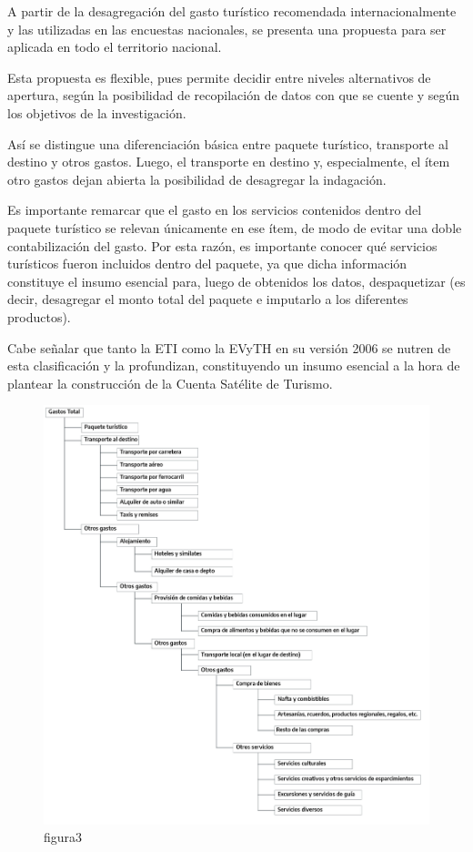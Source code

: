 \documentclass[
]{book}
\begin{document}
A partir de la desagregación del gasto turístico recomendada internacionalmente y las utilizadas en las encuestas nacionales, se presenta una propuesta para ser aplicada en todo el territorio nacional.

Esta propuesta es flexible, pues permite decidir entre niveles alternativos de apertura, según la posibilidad de recopilación de datos con que se cuente y según los objetivos de la investigación.

Así se distingue una diferenciación básica entre paquete turístico, transporte al destino y otros gastos. Luego, el transporte en destino y, especialmente, el ítem otro gastos dejan abierta la posibilidad de desagregar la indagación.

Es importante remarcar que el gasto en los servicios contenidos dentro del paquete turístico se relevan únicamente en ese ítem, de modo de evitar una doble contabilización del gasto. Por esta razón, es importante conocer qué servicios turísticos fueron incluidos dentro del paquete, ya que dicha información constituye el insumo esencial para, luego de obtenidos los datos, despaquetizar (es decir, desagregar el monto total del paquete e imputarlo a los diferentes productos).

Cabe señalar que tanto la ETI como la EVyTH en su versión 2006 se nutren de esta clasificación y la profundizan, constituyendo un insumo esencial a la hora de plantear la construcción de la Cuenta Satélite de Turismo.

\begin{figure}

{\centering \includegraphics[width=1\linewidth]{imagenes/figura_3} 

}

\caption{figura3}\label{fig:Gastototal}
\end{figure}
\end{document}
